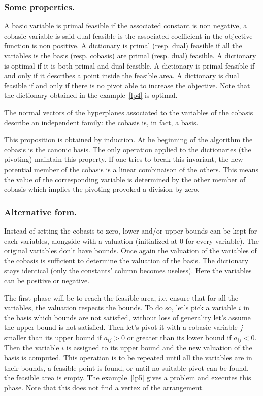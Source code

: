 \subsubsection{Some properties.}
A basic variable is primal feasible if the associated constant is non negative, a cobasic variable is said dual feasible is the associated coefficient in the objective function is non positive. A dictionary is primal (resp. dual) feasible if all the variables is the basis (resp. cobasis) are primal (resp. dual) feasible. A dictionary is optimal if it is both primal and dual feasible. A dictionary is primal feasible if and only if it describes a point inside the feasible area. A dictionary is dual feasible if and only if there is no pivot able to increase the objective. Note that the dictionary obtained in the example~\ref{lp4} is optimal.

\begin{proposition}
The normal vectors of the hyperplanes associated to the variables of the cobasis describe an independent family: the cobasis is, in fact, a basis.
\end{proposition}
This proposition is obtained by induction. At he beginning of the algorithm the cobasis is the canonic basis. The only operation applied to the dictionaries (the pivoting) maintain this property. If one tries to break this invariant, the new potential member of the cobasis is a linear combinaison of the others. This means the value of the corresponding variable is determined by the other member of cobasis which implies the pivoting provoked a division by zero.


\subsubsection{Alternative form.}
\label{section_altsimplex}
Instead of setting the cobasis to zero, lower and/or upper bounds can be kept for each variables, alongside with a valuation (initialized at $0$ for every variable). The original variables don't have bounds. Once again the valuation of the variables of the cobasis is sufficient to determine the valuation of the basis. The dictionary stays identical (only the constants' column becomes useless). Here the variables can be positive or negative.

The first phase will be to reach the feasible area, i.e. ensure that for all the variables, the valuation respects the bounds. To do so, let's pick a variable $i$ in the basis which bounds are not satisfied, without loss of generality let's assume the upper bound is not satisfied. Then let's pivot it with a cobasic variable $j$ smaller than its upper bound if $a_{ij}>0$ or greater than its lower bound if $a_{ij}<0$. Then the variable $i$ is assigned to its upper bound and the new valuation of the basis is computed. This operation is to be repeated until all the variables are in their bounds, a feasible point is found, or until no suitable pivot can be found, the feasible area is empty. The example~\ref{lp5} gives a problem and executes this phase. Note that this does not find a vertex of the arrangement.

